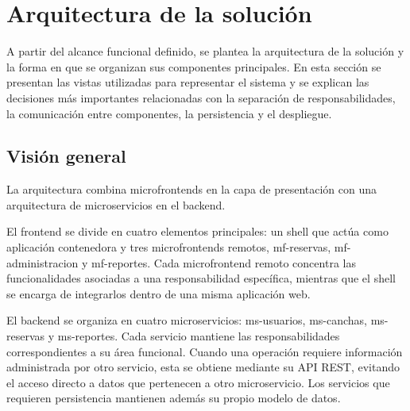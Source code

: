%
%

\section{Arquitectura de la solución}
\label{sec:arquitectura}

A partir del alcance funcional definido, se plantea la arquitectura de la solución
y la forma en que se organizan sus componentes principales. En esta sección se
presentan las vistas utilizadas para representar el sistema y se explican las
decisiones más importantes relacionadas con la separación de responsabilidades,
la comunicación entre componentes, la persistencia y el despliegue.

\subsection{Visión general}
\label{sec:vision-general}

La arquitectura combina microfrontends en la capa de presentación
con una arquitectura de microservicios en el backend. 

El frontend se divide en cuatro elementos principales: un shell 
que actúa como aplicación contenedora y tres microfrontends remotos, 
mf-reservas, mf-administracion y mf-reportes. 
Cada microfrontend remoto concentra las funcionalidades asociadas a una
responsabilidad específica, mientras que el shell se encarga de integrarlos
dentro de una misma aplicación web.

El backend se organiza en cuatro microservicios: ms-usuarios,
ms-canchas, ms-reservas y ms-reportes. Cada servicio mantiene
las responsabilidades correspondientes a su área funcional. Cuando una operación
requiere información administrada por otro servicio, esta se obtiene mediante su
API REST, evitando el acceso directo a datos que pertenecen a otro microservicio.
Los servicios que requieren persistencia mantienen además su propio modelo de datos.

